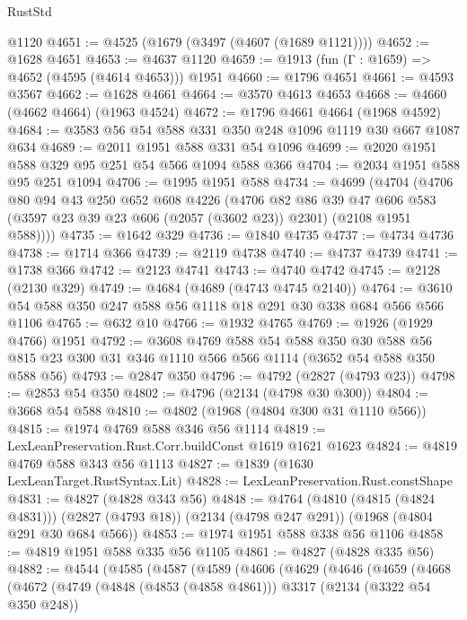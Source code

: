 \begin{lexlean}{RustStd}
\begin{coremodule}
    @1120
@4651 := @4525 (@1679 (@3497 (@4607 (@1689 @1121))))
@4652 := @1628 @4651
@4653 := @4637 @1120
@4659 := @1913 (fun (Γ : @1659) => @4652 (@4595 (@4614 @4653))) @1951
@4660 := @1796 @4651
@4661 := @4593 @3567
@4662 := @1628 @4661
@4664 := @3570 @4613 @4653
@4668 := @4660 (@4662 @4664) (@1963 @4524)
@4672 := @1796 @4661 @4664 (@1968 @4592)
@4684 := @3583 @56 @54 @588 @331 @350 @248 @1096 @1119 @30 @667 @1087 @634
@4689 := @2011 @1951 @588 @331 @54 @1096
@4699 := @2020 @1951 @588 @329 @95 @251 @54 @566 @1094 @588 @366
@4704 := @2034 @1951 @588 @95 @251 @1094
@4706 := @1995 @1951 @588
@4734 := @4699
    (@4704
      (@4706
        @80
        @94
        @43
        @250
        @652
        @608
        @4226
        (@4706
          @82
          @86
          @39
          @47
          @606
          @583
          (@3597 @23 @39 @23 @606 (@2057 (@3602 @23)) @2301)
          (@2108 @1951 @588))))
@4735 := @1642 @329
@4736 := @1840 @4735
@4737 := @4734 @4736
@4738 := @1714 @366
@4739 := @2119 @4738
@4740 := @4737 @4739
@4741 := @1738 @366
@4742 := @2123 @4741
@4743 := @4740 @4742
@4745 := @2128 (@2130 @329)
@4749 := @4684 (@4689 (@4743 @4745 @2140))
@4764 := @3610 @54 @588 @350 @247 @588 @56 @1118 @18 @291 @30 @338 @684 @566 @566 @1106
@4765 := @632 @10
@4766 := @1932 @4765
@4769 := @1926 (@1929 @4766) @1951
@4792 := @3608
    @4769
    @588
    @54
    @588
    @350
    @30
    @588
    @56
    @815
    @23
    @300
    @31
    @346
    @1110
    @566
    @566
    @1114
    (@3652 @54 @588 @350 @588 @56)
@4793 := @2847 @350
@4796 := @4792 (@2827 (@4793 @23))
@4798 := @2853 @54 @350
@4802 := @4796 (@2134 (@4798 @30 @300))
@4804 := @3668 @54 @588
@4810 := @4802 (@1968 (@4804 @300 @31 @1110 @566))
@4815 := @1974 @4769 @588 @346 @56 @1114
@4819 := LexLeanPreservation.Rust.Corr.buildConst @1619 @1621 @1623
@4824 := @4819 @4769 @588 @343 @56 @1113
@4827 := @1839 (@1630 LexLeanTarget.RustSyntax.Lit)
@4828 := LexLeanPreservation.Rust.constShape
@4831 := @4827 (@4828 @343 @56)
@4848 := @4764
    (@4810 (@4815 (@4824 @4831)))
    (@2827 (@4793 @18))
    (@2134 (@4798 @247 @291))
    (@1968 (@4804 @291 @30 @684 @566))
@4853 := @1974 @1951 @588 @338 @56 @1106
@4858 := @4819 @1951 @588 @335 @56 @1105
@4861 := @4827 (@4828 @335 @56)
@4882 := @4544
    (@4585
      (@4587
        (@4589
          (@4606
            (@4629
              (@4646
                (@4659
                  (@4668
                    (@4672
                      (@4749
                        (@4848 (@4853 (@4858 @4861)))
                        @3317
                        (@2134 (@3322 @54 @350 @248))

\end{coremodule}
\end{lexlean}
